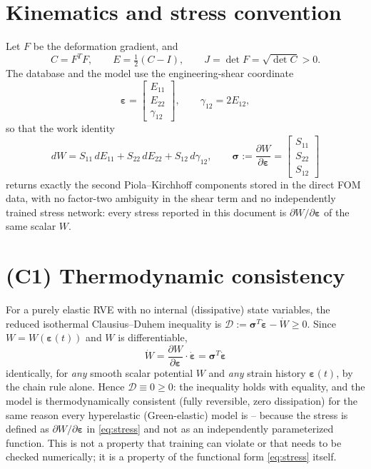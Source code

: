 \documentclass[10pt,a4paper]{article}
\begin{document}
\section{Kinematics and stress convention}
\label{sec:kinematics}
Let $F$ be the deformation gradient, and
\begin{equation}
 C=F^TF,\qquad E=\tfrac12(C-I),\qquad J=\det F=\sqrt{\det C}>0.
 \label{eq:kinematics}
\end{equation}
The database and the model use the engineering-shear coordinate
\begin{equation}
 \bm\varepsilon=\begin{bmatrix}E_{11}\\E_{22}\\\gamma_{12}\end{bmatrix},
 \qquad \gamma_{12}=2E_{12},
 \label{eq:e-coordinate}
\end{equation}
so that the work identity
\begin{equation}
 dW=S_{11}\,dE_{11}+S_{22}\,dE_{22}+S_{12}\,d\gamma_{12},\qquad
 \bm\sigma:=\frac{\partial W}{\partial\bm\varepsilon}
 =\begin{bmatrix}S_{11}\\S_{22}\\S_{12}\end{bmatrix}
 \label{eq:stress}
\end{equation}
returns exactly the second Piola--Kirchhoff components stored in the
direct FOM data, with no factor-two ambiguity in the shear term and no
independently trained stress network: every stress reported in this
document is $\partial W/\partial\bm\varepsilon$ of the same scalar $W$.

\section{(C1) Thermodynamic consistency}
\label{sec:c1}
For a purely elastic RVE with no internal (dissipative) state variables,
the reduced isothermal Clausius--Duhem inequality is
$\mathcal D:=\bm\sigma^T\dot{\bm\varepsilon}-\dot W\geq0$.  Since
$W=W(\bm\varepsilon(t))$ and $W$ is differentiable,
\begin{equation}
 \dot W=\frac{\partial W}{\partial\bm\varepsilon}\cdot\dot{\bm\varepsilon}
 =\bm\sigma^T\dot{\bm\varepsilon}
\end{equation}
identically, for \emph{any} smooth scalar potential $W$ and \emph{any}
strain history $\bm\varepsilon(t)$, by the chain rule alone.  Hence
$\mathcal D\equiv0\geq0$: the inequality holds with equality, and the
model is thermodynamically consistent (fully reversible, zero
dissipation) for the same reason every hyperelastic (Green-elastic) model
is -- because the stress is defined as $\partial W/\partial\bm\varepsilon$
in \eqref{eq:stress} and not as an independently parameterized function.
This is not a property that training can violate or that needs to be
checked numerically; it is a property of the functional form
\eqref{eq:stress} itself.
\end{document}
